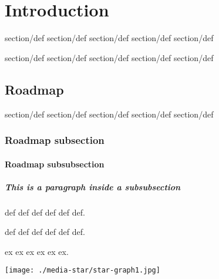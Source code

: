 \chapter{Introduction}
\label{ch:intro}

\begin{definition}


section/def section/def section/def
section/def section/def
\end{definition}

\begin{definition}
section/def section/def section/def
section/def section/def
\end{definition}



\section{Roadmap}
\label{sec:roadmap}



\begin{definition}
\label{def:one}
section/def section/def section/def
section/def section/def
\end{definition}



\subsection{Roadmap subsection}

\subsubsection{Roadmap subsubsection}
\paragraph{This is a paragraph inside a subsubsection}

\begin{definition}
\label{def:title}
  def def def
  def
  def def.
\end{definition}



\begin{group}
  
\begin{definition}
\label{def:title}
  def def def
  def
  def def.
\end{definition}



\begin{example}
\label{ex:title}
  ex ex ex
  ex
  ex ex.
  \begin{center}
  \texttt{[image: ./media-star/star-graph1.jpg]}
  \end{center}
\end{example}
\end{group}
